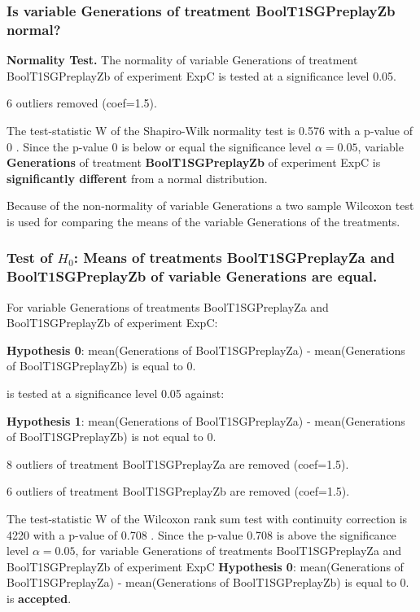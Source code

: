 \documentclass[18pt,c]{beamer}
\begin{document}
\begin{frame}[t]
 \frametitle{Is variable Generations of treatment BoolT1SGPreplayZb normal?}
 {\bf Normality Test.} The normality of variable Generations of treatment BoolT1SGPreplayZb of experiment ExpC is tested at a significance level 0.05.

 6 outliers removed (coef=1.5).
 
 The test-statistic W of the Shapiro-Wilk normality test is 0.576 with a p-value of 0 .
 Since the p-value 0 is below or equal the significance level $\alpha= 0.05 $,
 variable {\bf  Generations } of treatment {\bf  BoolT1SGPreplayZb } of experiment ExpC  is {\bf significantly different} from a normal distribution.

 \end{frame}
\begin{frame}
 Because  of the non-normality of variable Generations 
a two sample Wilcoxon test is used for comparing the means 
of the variable Generations of the treatments.
 \end{frame}
\begin{frame}[t]
 \frametitle{Test of $H_{0}$: Means of treatments BoolT1SGPreplayZa and BoolT1SGPreplayZb of variable Generations are equal. }
 \scriptsize
 For variable Generations of treatments BoolT1SGPreplayZa and BoolT1SGPreplayZb of experiment ExpC:

\vspace{1mm}
{\bf Hypothesis 0}: mean(Generations of BoolT1SGPreplayZa) - mean(Generations of BoolT1SGPreplayZb) is equal to 0.


 \begin{center} is tested at a significance level 0.05 against: \end{center}

{\bf Hypothesis 1}: mean(Generations of BoolT1SGPreplayZa) - mean(Generations of BoolT1SGPreplayZb) is not equal to 0.
\vspace{1mm}
\vspace{1mm}

 8 outliers of treatment BoolT1SGPreplayZa are removed (coef=1.5).

 6 outliers of treatment BoolT1SGPreplayZb are removed (coef=1.5).
\vspace{1mm}
 
 The test-statistic W of the Wilcoxon rank sum test with continuity correction is 4220 with a p-value of 0.708 .
 Since the p-value 0.708 is above the significance level $\alpha= 0.05 $,
 for variable Generations of treatments BoolT1SGPreplayZa and BoolT1SGPreplayZb of experiment ExpC 
 {\bf Hypothesis 0}: mean(Generations of BoolT1SGPreplayZa) - mean(Generations of BoolT1SGPreplayZb) is equal to 0.
is {\bf accepted}.

 \end{frame}
\end{document}

